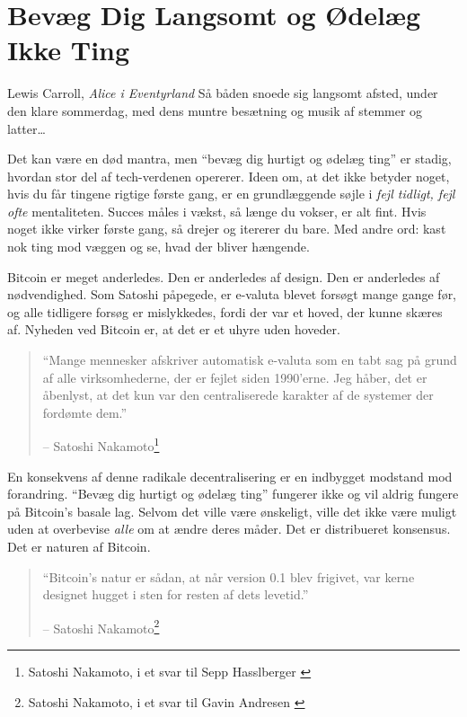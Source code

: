 \chapter{Bevæg Dig Langsomt og Ødelæg Ikke Ting}
\label{les:18}

\begin{chapquote}{Lewis Carroll, \textit{Alice i Eventyrland}}
Så båden snoede sig langsomt afsted, under den klare sommerdag, med dens muntre besætning og musik af stemmer og latter\ldots
\end{chapquote}

Det kan være en død mantra, men \enquote{bevæg dig hurtigt og ødelæg ting} er stadig, hvordan
stor del af tech-verdenen opererer. Ideen om, at det ikke betyder noget, hvis du
får tingene rigtige første gang, er en grundlæggende søjle i \textit{fejl tidligt,
fejl ofte} mentaliteten. Succes måles i vækst, så længe du
vokser, er alt fint. Hvis noget ikke virker første gang, så
drejer og itererer du bare. Med andre ord: kast nok ting mod
væggen og se, hvad der bliver hængende.

Bitcoin er meget anderledes. Den er anderledes af design. Den er anderledes
af nødvendighed. Som Satoshi påpegede, er e-valuta blevet forsøgt
mange gange før, og alle tidligere forsøg er mislykkedes, fordi der
var et hoved, der kunne skæres af. Nyheden ved Bitcoin er, at det er
et uhyre uden hoveder.

\begin{quotation}\begin{samepage}
\enquote{Mange mennesker afskriver automatisk e-valuta som en tabt sag
på grund af alle virksomhederne, der er fejlet siden 1990'erne. Jeg håber, det er
åbenlyst, at det kun var den centraliserede karakter af de systemer
der fordømte dem.}
\begin{flushright} -- Satoshi Nakamoto\footnote{Satoshi Nakamoto, i et svar til Sepp Hasslberger \cite{satoshi-centralized-nature}}
\end{flushright}\end{samepage}\end{quotation}

En konsekvens af denne radikale decentralisering er en indbygget modstand mod forandring. \enquote{Bevæg dig hurtigt og ødelæg ting} fungerer ikke og vil aldrig fungere på Bitcoin's basale lag. Selvom det ville være ønskeligt, ville det ikke være muligt uden at overbevise \textit{alle} om at ændre deres måder. Det er distribueret konsensus. Det er naturen af Bitcoin.

\begin{quotation}\begin{samepage}
\enquote{Bitcoin's natur er sådan, at når version 0.1 blev frigivet, var
kerne designet hugget i sten for resten af dets levetid.}
\begin{flushright} -- Satoshi Nakamoto\footnote{Satoshi Nakamoto, i et svar til Gavin Andresen \cite{satoshi-centralized-nature}}
\end{flushright}\end{samepage}\end{quotation}

